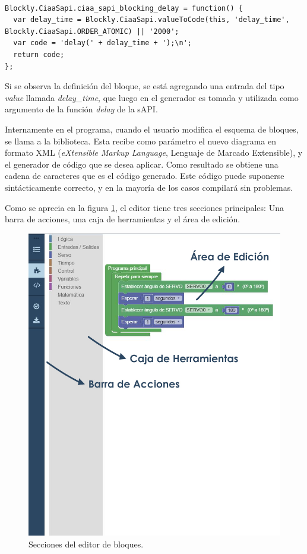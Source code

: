 \begin{lstlisting}[caption=Generador de código en lenguaje C para el retardo bloqueante.]

Blockly.CiaaSapi.ciaa_sapi_blocking_delay = function() {
  var delay_time = Blockly.CiaaSapi.valueToCode(this, 'delay_time', Blockly.CiaaSapi.ORDER_ATOMIC) || '2000';
  var code = 'delay(' + delay_time + ');\n';
  return code;
};
\end{lstlisting}

Si se observa la definición del bloque, se está agregando una entrada del tipo \emph{value} llamada \emph{delay\_time}, que luego en el generador es tomada y utilizada como argumento de la función \emph{delay} de la sAPI.

Internamente en el programa, cuando el usuario modifica el esquema de bloques, se llama a la biblioteca. Esta recibe como parámetro el nuevo diagrama en formato XML (\emph{eXtensible Markup Language}, Lenguaje de Marcado Extensible), y el generador de código que se desea aplicar. Como resultado se obtiene una cadena de caracteres que es el código generado. Este código puede suponerse sintácticamente correcto, y en la mayoría de los casos compilará sin problemas.

Como se aprecia en la figura \ref{fig:secciones-editor}, el editor tiene tres secciones principales: Una barra de acciones, una caja de herramientas y el área de edición.

\begin{figure}[h]
\centering
\includegraphics[scale=.5]{./Figures/editor.jpg}
\caption{Secciones del editor de bloques.}
\label{fig:secciones-editor}
\end{figure}

